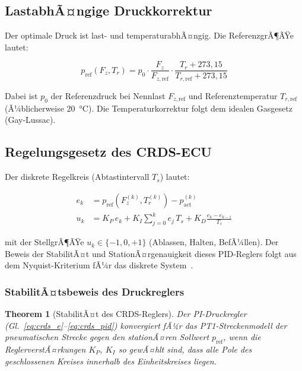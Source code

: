﻿\documentclass[12pt,a4paper]{article}
\newtheorem{theorem}{Theorem}[section]
\theoremstyle{definition}
\theoremstyle{remark}
\newcommand{\pref}{p_{\mathrm{ref}}}
\newcommand{\pact}{p_{\mathrm{act}}}
\newcommand{\Fz}{F_z}
\begin{document}
\subsection{LastabhÃ¤ngige Druckkorrektur}

Der optimale Druck ist last- und temperaturabhÃ¤ngig. Die ReferenzgrÃ¶ÃŸe lautet:

\begin{equation}
  \pref(\Fz, T_r) = p_0 \cdot \frac{\Fz}{F_{z,\mathrm{ref}}} \cdot
    \frac{T_r + 273{,}15}{T_{r,\mathrm{ref}} + 273{,}15}
  \label{eq:pref_adapt}
\end{equation}

Dabei ist $p_0$ der Referenzdruck bei Nennlast $F_{z,\mathrm{ref}}$ und
Referenztemperatur $T_{r,\mathrm{ref}}$ (Ã¼blicherweise \SI{20}{\celsius}).
Die Temperaturkorrektur folgt dem idealen Gasgesetz (Gay-Lussac).

\subsection{Regelungsgesetz des CRDS-ECU}

Der diskrete Regelkreis (Abtastintervall $T_s$) lautet:

\begin{align}
  e_k &= \pref\!\left(\Fz^{(k)}, T_r^{(k)}\right) - \pact^{(k)} \label{eq:crds_e}\\
  u_k &= K_P \, e_k + K_I \sum_{j=0}^{k} e_j \, T_s + K_D \frac{e_k - e_{k-1}}{T_s}
       \label{eq:crds_pid}
\end{align}

mit der StellgrÃ¶ÃŸe $u_k \in \{-1, 0, +1\}$ (Ablassen, Halten, BefÃ¼llen).
Der Beweis der StabilitÃ¤t und StationÃ¤rgenauigkeit dieses PID-Reglers
folgt aus dem Nyquist-Kriterium fÃ¼r das diskrete System~\cite{Astrom1997}.

\subsubsection{StabilitÃ¤tsbeweis des Druckreglers}

\begin{theorem}[StabilitÃ¤t des CRDS-Reglers]
\label{thm:crds_stability}
Der PI-Druckregler (Gl.~\eqref{eq:crds_e}--\eqref{eq:crds_pid}) konvergiert
fÃ¼r das PT1-Streckenmodell der pneumatischen Strecke gegen den stationÃ¤ren
Sollwert $\pref$, wenn die ReglerverstÃ¤rkungen $K_P$, $K_I$ so gewÃ¤hlt sind,
dass alle Pole des geschlossenen Kreises innerhalb des Einheitskreises liegen.
\end{theorem}
\end{document}
